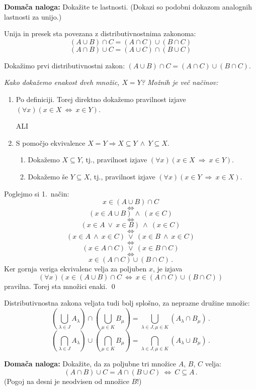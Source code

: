 \documentclass[11pt,paper=b5,DIV=13,headinclude,footinclude]{scrbook}
\def\ali {{~\vee~}}
\def\inn {{~\wedge~}}
\def\sledi {{~\Rightarrow~}}
\def\cee {{~\Leftrightarrow~}}
\begin{document}
\bigskip
\textbf{ Domača naloga:} Dokažite te lastnosti. (Dokazi so podobni dokazom analognih lastnosti za unijo.)

\bigskip
Unija in presek sta povezana z distributivnostnima zakonoma:
$$(A\cup B)\cap C = (A\cap C)\cup (B\cap C)$$
$$(A\cap B)\cup C = (A\cup C)\cap (B\cup C)$$

Dokažimo prvi distributivnostni zakon:
$(A\cup B)\cap C = (A\cap C)\cup (B\cap C)$.

{\em Kako dokažemo enakost dveh množic, $X = Y$? Možnih je več načinov:
\begin{enumerate}
 \item Po definiciji. Torej
    direktno dokažemo pravilnost izjave $(\forall x)(x\in X\cee x\in Y)$.

    ALI

\item  S pomočjo ekvivalence $X = Y \Longrightarrow X\subseteq Y \inn Y\subseteq X$.
\begin{enumerate}
         \item   Dokažemo $X\subseteq Y$, tj., pravilnost izjave $(\forall x)(x\in X\sledi x\in Y)$.
 \item Dokažemo še $Y\subseteq X$, tj., pravilnost izjave $(\forall x)(x\in Y\sledi x\in X)$.
        \end{enumerate}
        \end{enumerate}}

Poglejmo si 1.~način:
$$x\in (A\cup B)\cap C$$
$$\cee$$
$$(x\in A\cup B) \inn (x\in C)$$
$$\cee$$
$$(x\in A\ali x\in B) \inn (x\in C)$$
$$\cee$$
$$(x\in A \inn  x\in C)\ali (x\in B \inn  x\in C) $$
$$\cee$$
$$(x\in A \cap C)\ali (x\in B \cap C) $$
$$\cee$$
$$x\in (A \cap C)\cup (B \cap C)\,.$$
Ker gornja veriga ekvivalenc velja za poljuben $x$, je izjava
$$(\forall x)(x\in (A\cup B)\cap C\cee x\in (A \cap C)\cup (B \cap C))$$
pravilna. Torej sta množici enaki.
\qed

Distributivnostna zakona veljata tudi bolj splošno, za neprazne družine množic:
$$(\bigcup_{\lambda\in J}A_\lambda)\cap (\bigcup_{\mu\in K}B_\mu) =
\bigcup_{\lambda\in J, \mu\in K}(A_\lambda\cap B_\mu)\,.$$
$$(\bigcap_{\lambda\in J}A_\lambda)\cup (\bigcap_{\mu\in K}B_\mu) =
\bigcap_{\lambda\in J, \mu\in K}(A_\lambda\cup B_\mu)\,.$$

\medskip
\textbf{ Domača naloga:} Dokažite, da za poljubne tri množice $A$, $B$, $C$ velja:
$$(A\cap B)\cup C = A\cap (B\cup C) \cee C\subseteq A\,.$$
(Pogoj na desni je neodvisen od množice $B$!)

%
%
%
%
%
%
\bigskip
\end{document}
